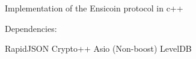 Implementation of the Ensicoin protocol in c++

Dependencies\+: \begin{DoxyVerb}RapidJSON
Crypto++
Asio (Non-boost)
LevelDB\end{DoxyVerb}
 